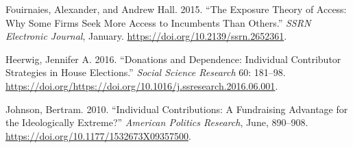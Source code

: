 \documentclass[12pt,]{article}
\begin{document}
\leavevmode\hypertarget{ref-fouirnaies2015}{}%
Fouirnaies, Alexander, and Andrew Hall. 2015. ``The Exposure Theory of
Access: Why Some Firms Seek More Access to Incumbents Than Others.''
\emph{SSRN Electronic Journal}, January.
\url{https://doi.org/10.2139/ssrn.2652361}.

\leavevmode\hypertarget{ref-heerwig2016}{}%
Heerwig, Jennifer A. 2016. ``Donations and Dependence: Individual
Contributor Strategies in House Elections.'' \emph{Social Science
Research} 60: 181--98.
\url{https://doi.org/https://doi.org/10.1016/j.ssresearch.2016.06.001}.

\leavevmode\hypertarget{ref-johnson2010}{}%
Johnson, Bertram. 2010. ``Individual Contributions: A Fundraising
Advantage for the Ideologically Extreme?'' \emph{American Politics
Research}, June, 890--908.
\url{https://doi.org/10.1177/1532673X09357500}.





\newpage
\singlespacing 
\end{document}
